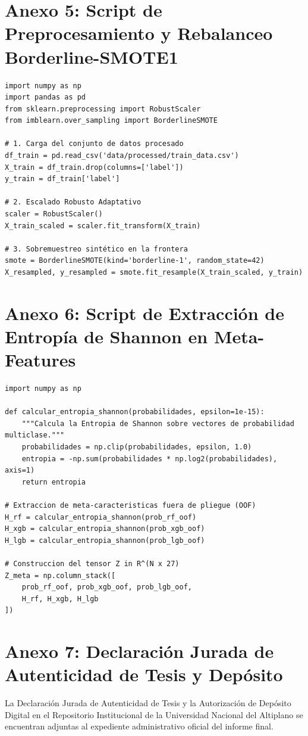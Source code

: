 \vspace{0.8em}
\section*{Anexo 5: Script de Preprocesamiento y Rebalanceo Borderline-SMOTE1}
\begin{verbatim}
import numpy as np
import pandas as pd
from sklearn.preprocessing import RobustScaler
from imblearn.over_sampling import BorderlineSMOTE

# 1. Carga del conjunto de datos procesado
df_train = pd.read_csv('data/processed/train_data.csv')
X_train = df_train.drop(columns=['label'])
y_train = df_train['label']

# 2. Escalado Robusto Adaptativo
scaler = RobustScaler()
X_train_scaled = scaler.fit_transform(X_train)

# 3. Sobremuestreo sintético en la frontera
smote = BorderlineSMOTE(kind='borderline-1', random_state=42)
X_resampled, y_resampled = smote.fit_resample(X_train_scaled, y_train)
\end{verbatim}

\vspace{0.8em}
\section*{Anexo 6: Script de Extracción de Entropía de Shannon en Meta-Features}
\begin{verbatim}
import numpy as np

def calcular_entropia_shannon(probabilidades, epsilon=1e-15):
    """Calcula la Entropia de Shannon sobre vectores de probabilidad multiclase."""
    probabilidades = np.clip(probabilidades, epsilon, 1.0)
    entropia = -np.sum(probabilidades * np.log2(probabilidades), axis=1)
    return entropia

# Extraccion de meta-caracteristicas fuera de pliegue (OOF)
H_rf = calcular_entropia_shannon(prob_rf_oof)
H_xgb = calcular_entropia_shannon(prob_xgb_oof)
H_lgb = calcular_entropia_shannon(prob_lgb_oof)

# Construccion del tensor Z in R^(N x 27)
Z_meta = np.column_stack([
    prob_rf_oof, prob_xgb_oof, prob_lgb_oof,
    H_rf, H_xgb, H_lgb
])
\end{verbatim}

\vspace{0.8em}
\section*{Anexo 7: Declaración Jurada de Autenticidad de Tesis y Depósito}
La Declaración Jurada de Autenticidad de Tesis y la Autorización de Depósito Digital en el Repositorio Institucional de la Universidad Nacional del Altiplano se encuentran adjuntas al expediente administrativo oficial del informe final.